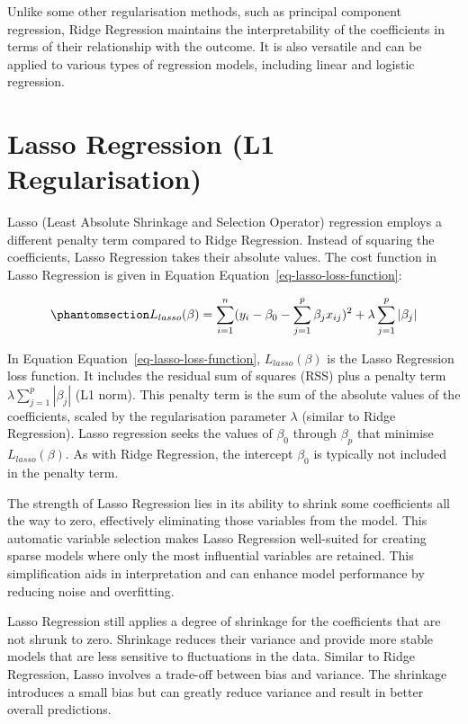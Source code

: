 \documentclass[
  letterpaper,
]{book}
\begin{document}
Unlike some other regularisation methods, such as principal component
regression, Ridge Regression maintains the interpretability of the
coefficients in terms of their relationship with the outcome. It is also
versatile and can be applied to various types of regression models,
including linear and logistic regression.

\section{Lasso Regression (L1
Regularisation)}\label{lasso-regression-l1-regularisation}

Lasso (Least Absolute Shrinkage and Selection Operator) regression
employs a different penalty term compared to Ridge Regression. Instead
of squaring the coefficients, Lasso Regression takes their absolute
values. The cost function in Lasso Regression is given in Equation
Equation~\ref{eq-lasso-loss-function}:

\begin{equation}\phantomsection\label{eq-lasso-loss-function}{L_{lasso}(\beta) = \sum_{i=1}^{n} (y_i - \beta_0 - \sum_{j=1}^{p} \beta_j x_{ij})^2 + \lambda \sum_{j=1}^{p} |\beta_j|}\end{equation}

In Equation Equation~\ref{eq-lasso-loss-function}, \(L_{lasso}(\beta)\)
is the Lasso Regression loss function. It includes the residual sum of
squares (RSS) plus a penalty term \(\lambda \sum_{j=1}^{p} |\beta_j|\)
(L1 norm). This penalty term is the sum of the absolute values of the
coefficients, scaled by the regularisation parameter \(\lambda\)
(similar to Ridge Regression). Lasso regression seeks the values of
\(\beta_0\) through \(\beta_p\) that minimise \(L_{lasso}(\beta)\). As
with Ridge Regression, the intercept \(\beta_0\) is typically not
included in the penalty term.

The strength of Lasso Regression lies in its ability to shrink some
coefficients all the way to zero, effectively eliminating those
variables from the model. This automatic variable selection makes Lasso
Regression well-suited for creating sparse models where only the most
influential variables are retained. This simplification aids in
interpretation and can enhance model performance by reducing noise and
overfitting.

Lasso Regression still applies a degree of shrinkage for the
coefficients that are not shrunk to zero. Shrinkage reduces their
variance and provide more stable models that are less sensitive to
fluctuations in the data. Similar to Ridge Regression, Lasso involves a
trade-off between bias and variance. The shrinkage introduces a small
bias but can greatly reduce variance and result in better overall
predictions.
\end{document}
